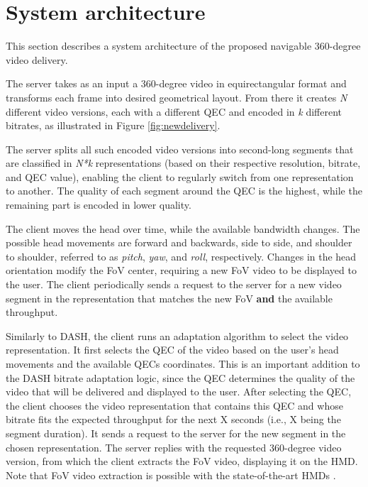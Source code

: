 \section{System architecture}

This section describes a system architecture of the proposed navigable 360-degree video delivery. %

 The server takes as an input a 360-degree video in equirectangular format and transforms each frame into desired geometrical layout. From there it creates \textit{N} different video versions, each with a different QEC and encoded in \textit{k} different bitrates, as illustrated in Figure \ref{fig:newdelivery}. 

The server splits all such encoded video versions into second-long segments that are classified in \textit{N*k} representations (based on their respective resolution, bitrate, and QEC value), enabling the client to regularly switch from one representation to another. The quality of each segment around the QEC is the highest, while the remaining part is encoded in lower quality.

 The client moves the head over time, while the available bandwidth changes. The possible head movements are forward and backwards, side to side, and shoulder to shoulder, referred to as \emph{pitch}, \emph{yaw}, and \emph{roll}, respectively. Changes in the head orientation modify the FoV center, requiring a new FoV video to be displayed to the user. The client periodically sends a request to the server for a new video segment in the representation that matches the new FoV \textbf{and} the available throughput.

 Similarly to DASH, the client runs an adaptation algorithm to select the video representation.
It first selects the QEC of the video based on the user's head movements and the available QECs coordinates. This is an important addition to the DASH bitrate adaptation logic, since the QEC determines the quality of the video that will be delivered and displayed to the user. After selecting the QEC, the client chooses the video representation that contains this QEC and whose bitrate fits the expected throughput for the next X seconds (i.e., X being the segment duration). It sends a request to the server for the new segment in the chosen representation. The server replies with the requested 360-degree video version, from which the client extracts the FoV video, displaying it on the HMD. Note that FoV video extraction is possible with the state-of-the-art HMDs \cite{fovhmds}. %

